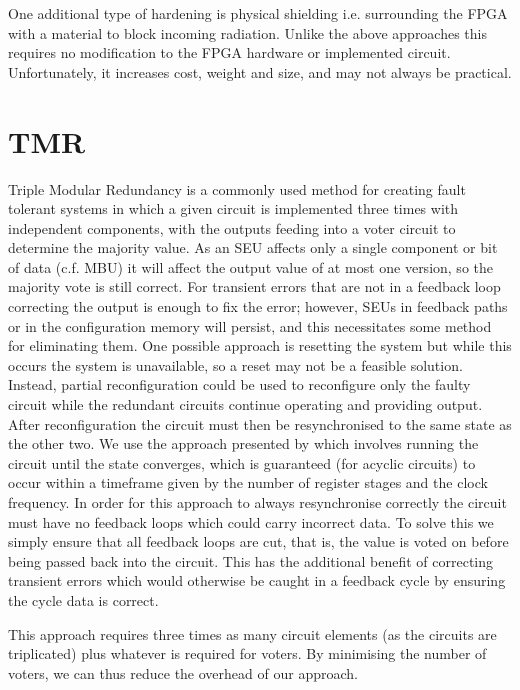 \documentclass[12pt,final,oneside]{dwThesis} %
\begin{document}
   One additional type of hardening is physical shielding i.e. surrounding the
   \gls{FPGA} with a material to block incoming radiation. Unlike the above
   approaches this requires no modification to the \gls{FPGA} hardware or
   implemented circuit. Unfortunately, it increases cost, weight and size, and
   may not always be practical. 

 \section{\gls{TMR}}\label{secTMR} Triple Modular Redundancy is a
commonly used method for creating fault tolerant systems in which a given
circuit is implemented three times with independent components, with the
outputs feeding into a voter circuit to determine the majority value. As an
\gls{SEU} affects only a single component or bit of data (c.f. \gls{MBU}) it
will affect the output value of at most one version, so the majority vote is
still correct. For transient errors that are not in a feedback loop correcting
the output is enough to fix the error; however, \glspl{SEU} in feedback paths
or in the configuration memory will persist, and this necessitates some method
for eliminating them. One possible approach is resetting the system but while
this occurs the system is unavailable, so a reset may not be a feasible
solution. Instead, partial reconfiguration could be used to reconfigure only
the faulty circuit while the redundant circuits continue operating and
providing output. After reconfiguration the circuit must then be resynchronised
to the same state as the other two. We use the approach presented by
\cite{DiesselChange} which involves running the circuit until the state
converges, which is guaranteed (for acyclic circuits) to occur within a
timeframe given by the number of register stages and the clock frequency. In
order for this approach to always resynchronise correctly the circuit must have
no feedback loops which could carry incorrect data. To solve this we simply
ensure that all feedback loops are \gls{cut}, that is, the value is voted on
before being passed back into the circuit. This has the additional benefit of
correcting transient errors which would otherwise be caught in a feedback cycle
by ensuring the cycle data is correct.

   This approach requires three times as many circuit elements (as the circuits
   are triplicated) plus whatever is required for voters. By minimising the
   number of voters, we can thus reduce the overhead of our approach.
\end{document}
